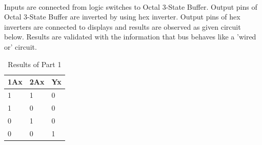 \documentclass[pdftex,12pt,a4paper]{article}
\begin{document}
\begin{flushleft}
\paragraph{}
Inputs are connected from logic switches to Octal 3-State Buffer. Output pins of Octal 3-State Buffer are inverted by using hex inverter. Output pins of hex inverters are connected to displays and results are observed as given circuit below. Results are validated with the information that bus behaves like a 'wired or' circuit.

\begin{table}[h]
\centering
\begin{tabular}{|l|l|l|}
\hline
1Ax & 2Ax & Yx \\ \hline
1   & 1   & 0  \\ \hline
1   & 0   & 0  \\ \hline
0   & 1   & 0  \\ \hline
0   & 0   & 1  \\ \hline
\end{tabular}
\label{table:part1}
\caption{Results of Part 1}
\end{table}




\end{flushleft}
\end{document}
